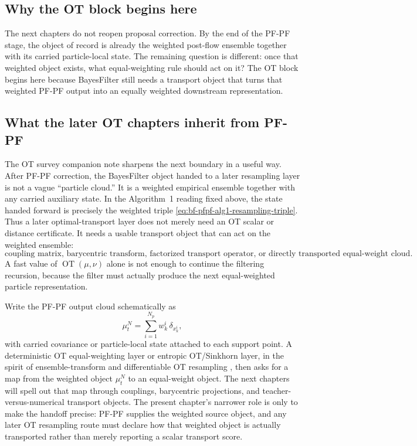 \subsection{Why the OT block begins here}
\label{sec:bf-pfpf-ot-why-here}

The next chapters do not reopen proposal correction.  By the end of the PF-PF
stage, the object of record is already the weighted post-flow ensemble together
with its carried particle-local state.  The remaining question is different: once
that weighted object exists, what equal-weighting rule should act on it?  The OT
block begins here because BayesFilter still needs a transport object that turns
that weighted PF-PF output into an equally weighted downstream representation.

\subsection{What the later OT chapters inherit from PF-PF}
\label{sec:bf-pfpf-ot-handoff}

The OT survey companion note sharpens the next boundary in a useful way.  After
PF-PF correction, the BayesFilter object handed to a later resampling layer is
not a vague ``particle cloud.''  It is a weighted empirical ensemble together
with any carried auxiliary state.  In the Algorithm~1 reading fixed above, the
state handed forward is precisely the weighted triple
\eqref{eq:bf-pfpf-alg1-resampling-triple}.  Thus a later optimal-transport
layer does not merely need an OT scalar or distance certificate.  It needs a
usable transport object that can act on the weighted ensemble:
\begin{equation}
\label{eq:bf-pfpf-transport-object-inventory}
  \text{coupling matrix, barycentric transform, factorized transport operator,}
  \text{ or directly transported equal-weight cloud.}
\end{equation}
A fast value of \(\operatorname{OT}(\mu,\nu)\) alone is not enough to continue the filtering
recursion, because the filter must actually produce the next equal-weighted
particle representation.

Write the PF-PF output cloud schematically as
\begin{equation}
\label{eq:bf-pfpf-weighted-output-cloud}
  \mu_t^N
  =
  \sum_{i=1}^{N_p} w_k^i\,\delta_{x_k^i},
\end{equation}
with carried covariance or particle-local state attached to each support point.
A deterministic OT equal-weighting layer or entropic OT/Sinkhorn layer, in the
spirit of ensemble-transform and differentiable OT resampling
\citep{reich2013nonparametric,corenflos2021differentiable}, then asks for a
map from the weighted object \(\mu_t^N\) to an equal-weight object.  The next
chapters will spell out that map through couplings, barycentric projections, and
teacher-versus-numerical transport objects.  The present chapter's narrower role
is only to make the handoff precise: PF-PF supplies the weighted source object,
and any later OT resampling route must declare how that weighted object is
actually transported rather than merely reporting a scalar transport score.


